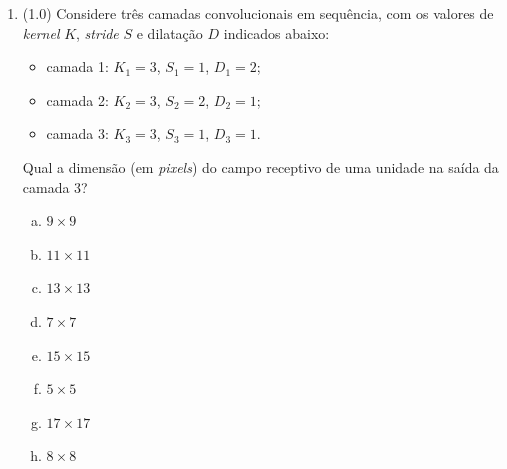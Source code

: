 \documentclass[11pt,a4paper]{article}
\begin{document}
\begin{enumerate}[1)]
\textbf{V.} Uma convolução $1 \times 1$ preserva as dimensões espaciais e serve, entre outras coisas, para alterar o número de canais (combinação linear entre canais em cada posição).

\begin{enumerate}[a)]
    \item Apenas I e V estão corretas.
    \item Apenas I, II, IV e V estão corretas.
    \item Apenas II, III e V estão corretas.
    \item Apenas I, II e V estão corretas.
    \item Apenas I, II e III estão corretas.
    \item Apenas I, III e IV estão corretas.
    \item Todas as afirmações estão corretas.
    \item Apenas II e V estão corretas.
\end{enumerate}

\item (1.0) Considere três camadas convolucionais em sequência, com os valores de \textit{kernel} $K$, \textit{stride} $S$ e dilatação $D$ indicados abaixo:

\begin{itemize}
    \item camada 1: $K_1 = 3$, $S_1 = 1$, $D_1 = 2$;
    \item camada 2: $K_2 = 3$, $S_2 = 2$, $D_2 = 1$;
    \item camada 3: $K_3 = 3$, $S_3 = 1$, $D_3 = 1$.
\end{itemize}

Qual a dimensão (em \textit{pixels}) do campo receptivo de uma unidade na saída da camada 3?

\begin{enumerate}[a)]
    \item $9 \times 9$
    \item $11 \times 11$
    \item $13 \times 13$
    \item $7 \times 7$
    \item $15 \times 15$
    \item $5 \times 5$
    \item $17 \times 17$
    \item $8 \times 8$
\end{enumerate}



\end{enumerate}
\end{document}
